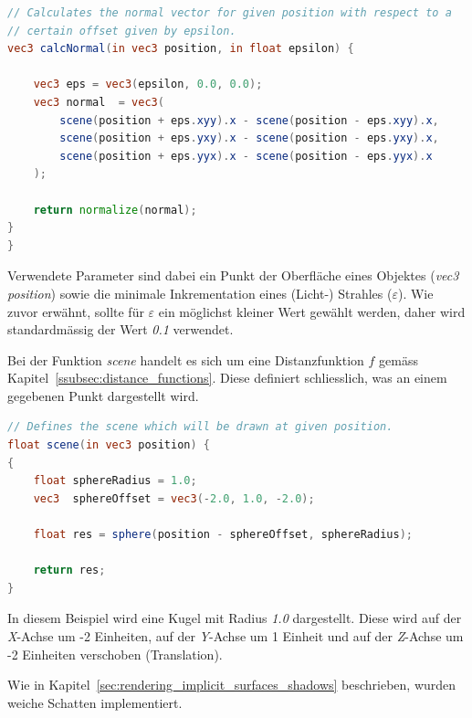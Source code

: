 \begin{lstlisting}[language=GLSL,caption={Berechnung der Normalen einer
        impliziten Oberfläche in
        GLSL.},label={alg:glsl_normal},captionpos=b,emph={calcNormal}]
// Calculates the normal vector for given position with respect to a
// certain offset given by epsilon.
vec3 calcNormal(in vec3 position, in float epsilon) {

    vec3 eps = vec3(epsilon, 0.0, 0.0);
    vec3 normal  = vec3(
        scene(position + eps.xyy).x - scene(position - eps.xyy).x,
        scene(position + eps.yxy).x - scene(position - eps.yxy).x,
        scene(position + eps.yyx).x - scene(position - eps.yyx).x
    );

    return normalize(normal);
}
}
\end{lstlisting}

Verwendete Parameter sind dabei ein Punkt der Oberfläche eines Objektes
(\textit{vec3 position}) sowie die minimale Inkrementation eines
(Licht-) Strahles ($\varepsilon$). Wie zuvor erwähnt, sollte
für $\varepsilon$ ein möglichst kleiner Wert gewählt werden, daher wird
standardmässig der Wert \textit{0.1} verwendet.

Bei der Funktion \textit{scene} handelt es sich um eine Distanzfunktion
$f$ gemäss Kapitel~\ref{ssubsec:distance_functions}. Diese definiert
schliesslich, was an einem gegebenen Punkt dargestellt wird.

\begin{lstlisting}[language=GLSL,caption={Distanzfunktion $f$ in
        GLSL.},label={alg:glsl_distance_func},captionpos=b,emph={scene}]
// Defines the scene which will be drawn at given position.
float scene(in vec3 position) {
{
    float sphereRadius = 1.0;
    vec3  sphereOffset = vec3(-2.0, 1.0, -2.0);

    float res = sphere(position - sphereOffset, sphereRadius);

    return res;
}
\end{lstlisting}

In diesem Beispiel wird eine Kugel mit Radius \textit{1.0} dargestellt.
Diese wird auf der \textit{X}-Achse um -2 Einheiten, auf der
\textit{Y}-Achse um 1 Einheit und auf der \textit{Z}-Achse um -2
Einheiten verschoben (Translation).

Wie in Kapitel~\ref{sec:rendering_implicit_surfaces_shadows}
beschrieben, wurden weiche Schatten implementiert.

